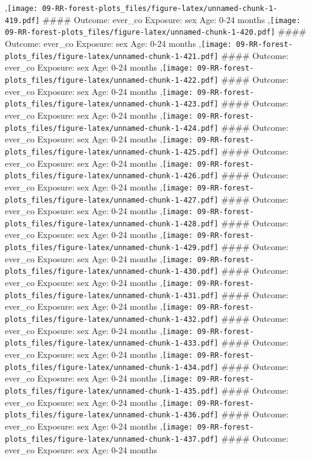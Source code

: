 \documentclass[
  9pt,
]{book}
\begin{document}
,\texttt{[image: 09-RR-forest-plots\_files/figure-latex/unnamed-chunk-1-419.pdf]}
\#\#\#\# Outcome: ever\_co Exposure: sex Age: 0-24 months
,\texttt{[image: 09-RR-forest-plots\_files/figure-latex/unnamed-chunk-1-420.pdf]}
\#\#\#\# Outcome: ever\_co Exposure: sex Age: 0-24 months
,\texttt{[image: 09-RR-forest-plots\_files/figure-latex/unnamed-chunk-1-421.pdf]}
\#\#\#\# Outcome: ever\_co Exposure: sex Age: 0-24 months
,\texttt{[image: 09-RR-forest-plots\_files/figure-latex/unnamed-chunk-1-422.pdf]}
\#\#\#\# Outcome: ever\_co Exposure: sex Age: 0-24 months
,\texttt{[image: 09-RR-forest-plots\_files/figure-latex/unnamed-chunk-1-423.pdf]}
\#\#\#\# Outcome: ever\_co Exposure: sex Age: 0-24 months
,\texttt{[image: 09-RR-forest-plots\_files/figure-latex/unnamed-chunk-1-424.pdf]}
\#\#\#\# Outcome: ever\_co Exposure: sex Age: 0-24 months
,\texttt{[image: 09-RR-forest-plots\_files/figure-latex/unnamed-chunk-1-425.pdf]}
\#\#\#\# Outcome: ever\_co Exposure: sex Age: 0-24 months
,\texttt{[image: 09-RR-forest-plots\_files/figure-latex/unnamed-chunk-1-426.pdf]}
\#\#\#\# Outcome: ever\_co Exposure: sex Age: 0-24 months
,\texttt{[image: 09-RR-forest-plots\_files/figure-latex/unnamed-chunk-1-427.pdf]}
\#\#\#\# Outcome: ever\_co Exposure: sex Age: 0-24 months
,\texttt{[image: 09-RR-forest-plots\_files/figure-latex/unnamed-chunk-1-428.pdf]}
\#\#\#\# Outcome: ever\_co Exposure: sex Age: 0-24 months
,\texttt{[image: 09-RR-forest-plots\_files/figure-latex/unnamed-chunk-1-429.pdf]}
\#\#\#\# Outcome: ever\_co Exposure: sex Age: 0-24 months
,\texttt{[image: 09-RR-forest-plots\_files/figure-latex/unnamed-chunk-1-430.pdf]}
\#\#\#\# Outcome: ever\_co Exposure: sex Age: 0-24 months
,\texttt{[image: 09-RR-forest-plots\_files/figure-latex/unnamed-chunk-1-431.pdf]}
\#\#\#\# Outcome: ever\_co Exposure: sex Age: 0-24 months
,\texttt{[image: 09-RR-forest-plots\_files/figure-latex/unnamed-chunk-1-432.pdf]}
\#\#\#\# Outcome: ever\_co Exposure: sex Age: 0-24 months
,\texttt{[image: 09-RR-forest-plots\_files/figure-latex/unnamed-chunk-1-433.pdf]}
\#\#\#\# Outcome: ever\_co Exposure: sex Age: 0-24 months
,\texttt{[image: 09-RR-forest-plots\_files/figure-latex/unnamed-chunk-1-434.pdf]}
\#\#\#\# Outcome: ever\_co Exposure: sex Age: 0-24 months
,\texttt{[image: 09-RR-forest-plots\_files/figure-latex/unnamed-chunk-1-435.pdf]}
\#\#\#\# Outcome: ever\_co Exposure: sex Age: 0-24 months
,\texttt{[image: 09-RR-forest-plots\_files/figure-latex/unnamed-chunk-1-436.pdf]}
\#\#\#\# Outcome: ever\_co Exposure: sex Age: 0-24 months
,\texttt{[image: 09-RR-forest-plots\_files/figure-latex/unnamed-chunk-1-437.pdf]}
\#\#\#\# Outcome: ever\_co Exposure: sex Age: 0-24 months
\end{document}
